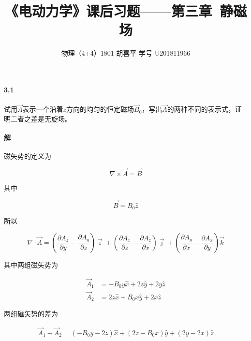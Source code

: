 \documentclass{article}
\author{物理（4+4）1801 \quad 胡喜平 \quad 学号 U201811966}
\affil{网站 https://hxp.plus/ \quad 邮件 hxp201406@gmail.com}
\title{《电动力学》课后习题——第三章\ 静磁场}
\begin{document}
\maketitle\thispagestyle{fancy}

\paragraph{3.1}

试用$\vec{A}$表示一个沿着$z$方向的均匀的恒定磁场$\vec{B}_0$，写出$\vec{A}$的两种不同的表示式，证明二者之差是无旋场。

\paragraph{解}

磁矢势的定义为

\begin{equation*}
  \nabla \times \vec{A} = \vec{B}
\end{equation*}

其中

\begin{equation*}
  \vec{B} = B_0 \hat{z}
\end{equation*}

所以

\begin{equation*}
  \nabla \cdot \vec{A} =
  \left( \frac{\partial A_{z}}{\partial y} - \frac{\partial A_{y}}{\partial z} \right) \vec{\imath}
  + \left( \frac{\partial A_{x}}{\partial z} - \frac{\partial A_{z}}{\partial x} \right) \vec{\jmath}
  + \left( \frac{\partial A_{y}}{\partial x} - \frac{\partial A_{x}}{\partial y} \right) \vec{k}
\end{equation*}

其中两组磁矢势为

\begin{equation*}
  \begin{aligned}
    \vec{A}_1 &= -B_0 y \hat{x} + 2 z \hat{y} + 2 y \hat{z} \\
    \vec{A}_2 &= 2 z \hat{x} + B_0 x \hat{y} + 2 x \hat{z}
  \end{aligned}
\end{equation*}

两组磁矢势的差为

\begin{equation*}
  \begin{aligned}
    \vec{A}_1 - \vec{A}_2 = 
    \left( - B_{0} y - 2z \right) \hat{x} + \left( 2z - B_0 x \right) \hat{y} + \left( 2y - 2x \right) \hat{z}
  \end{aligned}
\end{equation*}
\end{document}
